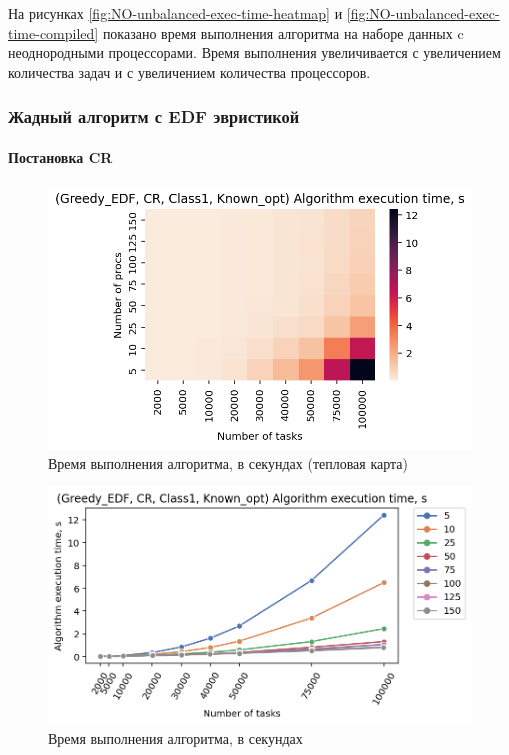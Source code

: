 На рисунках \ref{fig:NO-unbalanced-exec-time-heatmap} и \ref{fig:NO-unbalanced-exec-time-compiled} показано время выполнения алгоритма на наборе данных c неоднородными процессорами. Время выполнения увеличивается с увеличением количества задач и с увеличением количества процессоров.

\subsubsection{Жадный алгоритм с EDF эвристикой}

\paragraph{Постановка CR}

\begin{figure}[!htbp]
    \centering
    \includegraphics[width=\textwidth]{imgs/ideal_1/CR_EDF/et_heatmap.png}
    \caption{Время выполнения алгоритма, в секундах (тепловая карта)}
    \label{fig:CR-EDF-exec-time-heatmap}
\end{figure}

\begin{figure}[!htbp]
    \centering
    \includegraphics[width=\textwidth]{imgs/ideal_1/CR_EDF/tr_graph.png}
    \caption{Время выполнения алгоритма, в секундах}
    \label{fig:CR-EDF-exec-time-compiled}
\end{figure}

